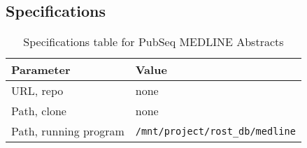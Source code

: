 \subsection{Specifications}

\begin{table}[htbp]
\caption{Specifications table for PubSeq MEDLINE Abstracts}
\centering
\begin{tabular}{ | l | l | }
  \hline
  Parameter & Value \\
  \hline
  URL, repo & none \\
  Path, clone & none \\
  Path, running program & \texttt{/mnt/project/rost\_db/medline}\\
  \hline
\end{tabular}
\end{table}


